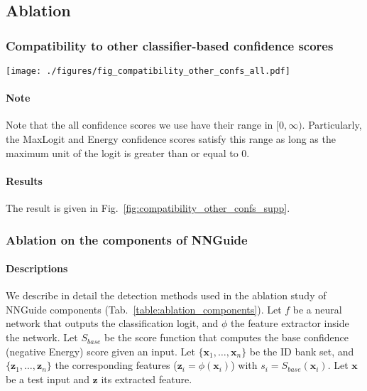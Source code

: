 \documentclass[10pt,twocolumn,letterpaper]{article}
\begin{document}
\subsection{Ablation}

\subsubsection{Compatibility to other classifier-based confidence scores}

\begin{figure*}[t]
\centering
\texttt{[image: ./figures/fig\_compatibility\_other\_confs\_all.pdf]}
\caption{
The compatibility to other classifier-based scores. The average performance across five different OODs is reported.
}
\label{fig:compatibility_other_confs_supp}
\end{figure*}

\paragraph{Note}
Note that the all confidence scores we use have their range in $[0, \infty)$. Particularly, the MaxLogit and Energy confidence scores satisfy this range as long as the maximum unit of the logit is greater than or equal to $0$.

\paragraph{Results}
The result is given in Fig.~\ref{fig:compatibility_other_confs_supp}.

\subsubsection{Ablation on the components of NNGuide}

\paragraph{Descriptions}
We describe in detail the detection methods used in the ablation study of NNGuide components (\ie Tab.~\ref{table:ablation_components}). Let $f$ be a neural network that outputs the classification logit, and $\phi$ the feature extractor inside the network. Let $S_{base}$ be the score function that computes the base confidence (\ie negative Energy) score given an input. Let $\{\mathbf{x}_1, \dots, \mathbf{x}_n\}$ be the ID bank set, and $\{\mathbf{z}_1, \dots, \mathbf{z}_n\}$ the corresponding features (\ie $\mathbf{z}_i = \phi(\mathbf{x}_i)$) with $s_i = S_{base}(\mathbf{x}_i)$.
Let $\mathbf{x}$ be a test input and $\mathbf{z}$ its extracted feature.  
\end{document}
